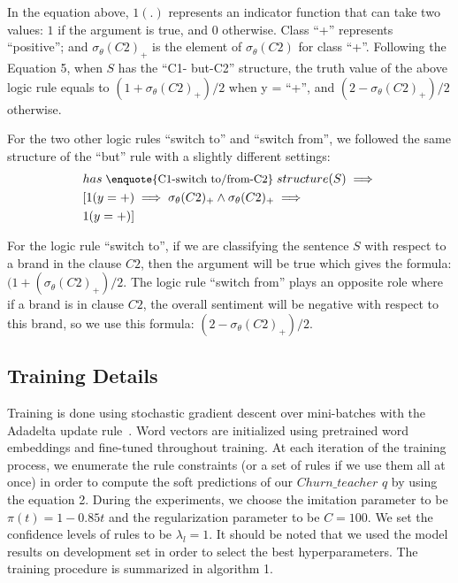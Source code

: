 \documentclass[11pt,letterpaper]{article}
\begin{document}
In the equation above, \(1(.)\) represents an indicator function that can take two values:  \(1\) if the argument is true, and \(0\) otherwise. Class \enquote{+} represents \enquote{positive}; and \(\sigma_\theta(C2)_+\) is the element of \(\sigma_\theta(C2)\) for class \enquote{+}. Following the Equation 5, when \(S\) has the \enquote{C1- but-C2} structure, the truth value of the above logic rule equals to \((1 + \sigma_\theta(C2)_+)/2\) when y = \enquote{+}, and \((2 - \sigma_\theta(C2)_+)/2\) otherwise. 

For the two other logic rules \enquote{switch to} and \enquote{switch from}, we followed the same structure of the \enquote{but} rule with a slightly different settings: 
\begin{equation}
\begin{split}
\begin{aligned}
&{\small has\; \text{\enquote{C1-switch to/from-C2}} \;structure(S) \implies } \\
&[1(y=+) \implies \sigma_\theta (C2)_+ \wedge \sigma_\theta (C2)_+ \implies \\
&  1(y=+)] \\
\end{aligned}
\end{split}
\end{equation}


For the logic rule \enquote{switch to}, if we are classifying the sentence \(S\) with respect to a brand in the clause \(C2\), then the argument will be true which gives the formula: \((1 + (\sigma_\theta(C2)_+)/2\). The logic rule \enquote{switch from} plays an opposite role where if a brand is in clause \(C2\), the overall sentiment will be negative with respect to this brand, so we use this formula: \((2 - \sigma_\theta(C2)_+)/2\).


\subsection{Training Details }

Training is done using stochastic gradient descent over mini-batches with the Adadelta update rule~\cite{zeiler}.  Word vectors are initialized using pretrained word embeddings and fine-tuned throughout training. At each iteration of the training process, we enumerate the rule constraints (or a set of rules if we use them all at once) in order to compute the soft predictions of our \(Churn\_teacher\) \(q\) by using the equation 2. During the experiments, we choose the imitation parameter to be \(\pi(t) = 1-0.85t\) and the regularization parameter to be \(C = 100\). We set the confidence levels of rules to be \(\lambda_l = 1\). It should be noted that we used the model results on development set in order to select the best hyperparameters. The training procedure is summarized in algorithm 1.
\end{document}
